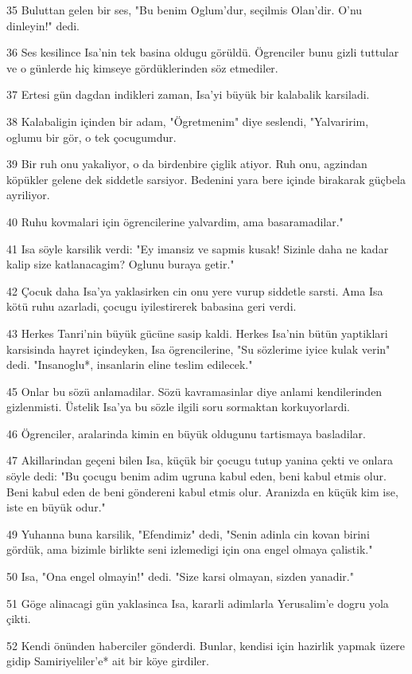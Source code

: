 \par 35 Buluttan gelen bir ses, "Bu benim Oglum'dur, seçilmis Olan'dir. O'nu dinleyin!" dedi.
\par 36 Ses kesilince Isa'nin tek basina oldugu görüldü. Ögrenciler bunu gizli tuttular ve o günlerde hiç kimseye gördüklerinden söz etmediler.
\par 37 Ertesi gün dagdan indikleri zaman, Isa'yi büyük bir kalabalik karsiladi.
\par 38 Kalabaligin içinden bir adam, "Ögretmenim" diye seslendi, "Yalvaririm, oglumu bir gör, o tek çocugumdur.
\par 39 Bir ruh onu yakaliyor, o da birdenbire çiglik atiyor. Ruh onu, agzindan köpükler gelene dek siddetle sarsiyor. Bedenini yara bere içinde birakarak güçbela ayriliyor.
\par 40 Ruhu kovmalari için ögrencilerine yalvardim, ama basaramadilar."
\par 41 Isa söyle karsilik verdi: "Ey imansiz ve sapmis kusak! Sizinle daha ne kadar kalip size katlanacagim? Oglunu buraya getir."
\par 42 Çocuk daha Isa'ya yaklasirken cin onu yere vurup siddetle sarsti. Ama Isa kötü ruhu azarladi, çocugu iyilestirerek babasina geri verdi.
\par 43 Herkes Tanri'nin büyük gücüne sasip kaldi. Herkes Isa'nin bütün yaptiklari karsisinda hayret içindeyken, Isa ögrencilerine, "Su sözlerime iyice kulak verin" dedi. "Insanoglu*, insanlarin eline teslim edilecek."
\par 45 Onlar bu sözü anlamadilar. Sözü kavramasinlar diye anlami kendilerinden gizlenmisti. Üstelik Isa'ya bu sözle ilgili soru sormaktan korkuyorlardi.
\par 46 Ögrenciler, aralarinda kimin en büyük oldugunu tartismaya basladilar.
\par 47 Akillarindan geçeni bilen Isa, küçük bir çocugu tutup yanina çekti ve onlara söyle dedi: "Bu çocugu benim adim ugruna kabul eden, beni kabul etmis olur. Beni kabul eden de beni göndereni kabul etmis olur. Aranizda en küçük kim ise, iste en büyük odur."
\par 49 Yuhanna buna karsilik, "Efendimiz" dedi, "Senin adinla cin kovan birini gördük, ama bizimle birlikte seni izlemedigi için ona engel olmaya çalistik."
\par 50 Isa, "Ona engel olmayin!" dedi. "Size karsi olmayan, sizden yanadir."
\par 51 Göge alinacagi gün yaklasinca Isa, kararli adimlarla Yerusalim'e dogru yola çikti.
\par 52 Kendi önünden haberciler gönderdi. Bunlar, kendisi için hazirlik yapmak üzere gidip Samiriyeliler'e* ait bir köye girdiler.
